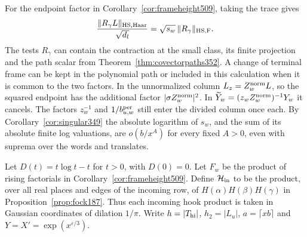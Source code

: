 \documentclass[a4paper,11pt]{article}
\theoremstyle{definition}
\theoremstyle{remark}
\numberwithin{equation}{section}
\begin{document}
For the endpoint factor in Corollary~\ref{cor:frameheight509},
taking the trace gives
\[
  \frac{\|R_\gamma L\|_{{\rm HS},{\rm Haar}}}{\sqrt{d_l}}
        =\sqrt{s_w}\,\|R_\gamma\|_{{\rm HS},{\rm F}} .
\]
The tests \(R_\gamma\) can contain the contraction at the
small class, its finite projection and the path scalar from
Theorem~\ref{thm:covectorpaths352}. A change of terminal frame
can be kept in the polynomial path or included in this
calculation when it is common to the two factors. In the
unnormalized column \(L_z=Z_w^{\rm norm}L\), so the squared
endpoint has the additional factor \(|\sigma Z_w^{\rm norm}|^2\).
In \(\widetilde Y_w=(z_w Z_w^{\rm norm})^{-1}Y_w\) it cancels.
The factors \(z_w^{-1}\) and \(1/b^{\rm per}_{u,w}\) still enter
the divided column once each. By Corollary~\ref{cor:singular349}
the absolute logarithm of \(s_w\), and the sum of its absolute
finite log valuations, are \(o(b/x^A)\) for every fixed \(A>0\),
even with suprema over the words and translates.

Let \(D(t)=t\log t-t\) for \(t>0\), with \(D(0)=0\).
Let \(F_w\) be the product of rising factorials in
Corollary~\ref{cor:frameheight509}. Define \(\mathcal H_{\rm in}\)
to be the product, over all real places and edges of the incoming
row, of \(H(\alpha)H(\beta)H(\gamma)\) in
Proposition~\ref{prop:fock187}. Thus each incoming hook product
is taken in Gaussian coordinates of dilation \(1/\pi\).
Write \(h=|T_{\rm hi}|\), \(h_2=|L_u|\),
\(a=\lceil xb\rceil\) and \(Y=X'=\exp(x^{\varepsilon/3})\).
\end{document}
